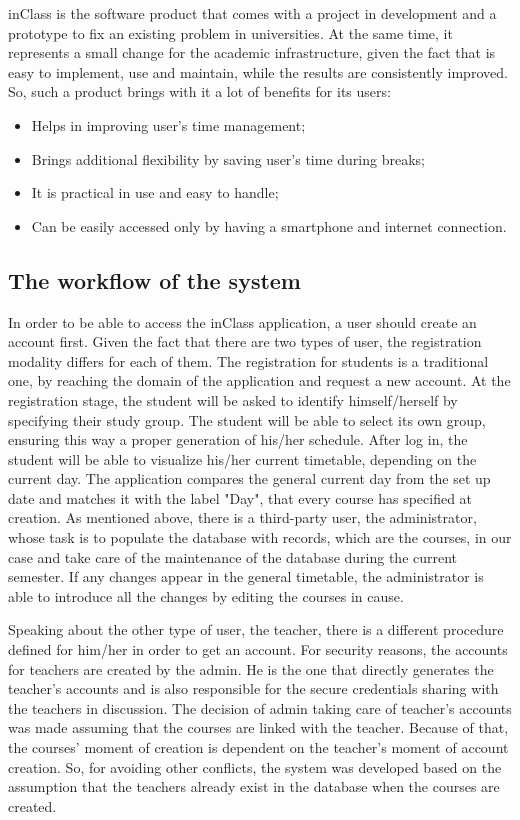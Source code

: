 inClass is the software product that comes with a project in development and a prototype to fix an existing problem in universities. At the same time, it represents a small change for the academic infrastructure, given the fact that is easy to implement, use and maintain, while the results are consistently improved. So, such a product brings with it a lot of benefits for its users:
\begin{itemize}
\item Helps in improving user's time management;
\item Brings additional flexibility by saving user's time during breaks;
\item It is practical in use and easy to handle;
\item Can be easily accessed only by having a smartphone and internet connection.
\end{itemize}

\subsection{The workflow of the system}
In order to be able to access the inClass application, a user should create an account first. Given the fact that there are two types of user, the registration modality differs for each of them. The registration for students is a traditional one, by reaching the domain of the application and request a new account. At the registration stage, the student will be asked to identify himself/herself by specifying their study group. The student will be able to select its own group, ensuring this way a proper generation of his/her schedule. After log in, the student will be able to visualize his/her current timetable, depending on the current day. The application compares the general current day from the set up date and matches it with the label "Day", that every course has specified at creation. As mentioned above, there is a third-party user, the administrator, whose task is to populate the database with records, which are the courses, in our case and take care of the maintenance of the database during the current semester. If any changes appear in the general timetable, the administrator is able to introduce all the changes by editing the courses in cause. 

Speaking about the other type of user, the teacher, there is a different procedure defined for him/her in order to get an account. For security reasons, the accounts for teachers are created by the admin. He is the one that directly generates the teacher's accounts and is also responsible for the secure credentials sharing with the teachers in discussion. The decision of admin taking care of teacher's accounts was made assuming that the courses are linked with the teacher. Because of that, the courses' moment of creation is dependent on the teacher's moment of account creation. So, for avoiding other conflicts, the system was developed based on the assumption that the teachers already exist in the database when the courses are created. 

